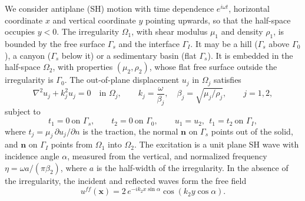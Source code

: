\documentclass[11pt,twoside]{article}
\begin{document}
We consider antiplane (SH) motion with time dependence $e^{i\omega t}$, horizontal coordinate $x$ and vertical coordinate $y$ pointing upwards, so that the half-space occupies $y<0$. The irregularity $\Omega_1$, with shear modulus $\mu_1$ and density $\rho_1$, is bounded by the free surface $\Gamma_s$ and the interface $\Gamma_I$. It may be a hill ($\Gamma_s$ above $\Gamma_0$), a canyon ($\Gamma_s$ below it) or a sedimentary basin (flat $\Gamma_s$). It is embedded in the half-space $\Omega_2$, with properties $(\mu_2,\rho_2)$, whose flat free surface outside the irregularity is $\Gamma_0$. The out-of-plane displacement $u_j$ in $\Omega_j$ satisfies
\begin{equation*}
  \nabla^2 u_j + k_j^2 u_j = 0 \quad \text{in } \Omega_j,
  \qquad k_j = \frac{\omega}{\beta_j},\quad \beta_j = \sqrt{\mu_j/\rho_j},
  \qquad j = 1,2,
\end{equation*}
subject to
\begin{equation}\label{eq:bcs}
  t_1 = 0 \ \text{on } \Gamma_s, \qquad
  t_2 = 0 \ \text{on } \Gamma_0, \qquad
  u_1 = u_2,\ \ t_1 = t_2 \ \text{on } \Gamma_I,
\end{equation}
where $t_j = \mu_j\,\partial u_j/\partial n$ is the traction, the normal $\mathbf{n}$ on $\Gamma_s$ points out of the solid, and $\mathbf{n}$ on $\Gamma_I$ points from $\Omega_1$ into $\Omega_2$. The excitation is a unit plane SH wave with incidence angle $\alpha$, measured from the vertical, and normalized frequency $\eta = \omega a/(\pi\beta_2)$, where $a$ is the half-width of the irregularity. In the absence of the irregularity, the incident and reflected waves form the free field
\begin{equation*}
  u^{f\!f}(\mathbf{x}) = 2\, e^{-ik_2 x\sin\alpha}\cos(k_2 y\cos\alpha).
\end{equation*}
\end{document}
